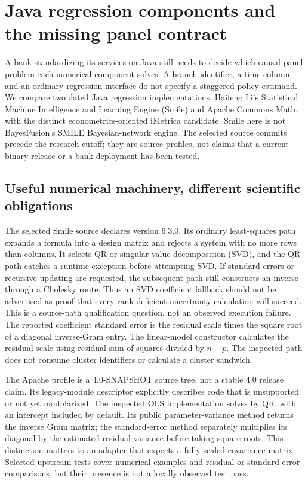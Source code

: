 
\section{Java regression components and the missing panel contract}
\label{sec:exec25-panels-java}
A bank standardizing its services on Java still needs to decide which causal
panel problem each numerical component solves. A branch identifier, a time
column and an ordinary regression interface do not specify a staggered-policy
estimand. We compare two dated Java regression implementations, Haifeng Li's
Statistical Machine Intelligence and Learning Engine (Smile) and Apache
Commons Math, with the distinct econometrics-oriented iMetrica candidate.
Smile here is not BayesFusion's SMILE Bayesian-network engine. The selected
source commits precede the research cutoff; they are source profiles, not
claims that a current binary release or a bank deployment has been tested.
\citep{exec25_paneljava_smile,exec25_paneljava_commons,exec25_paneljava_imetrica}

\subsection{Useful numerical machinery, different scientific obligations}
The selected Smile source declares version 6.3.0. Its ordinary least-squares
path expands a formula into a design matrix and rejects a system with no more
rows than columns. It selects QR or singular-value decomposition (SVD), and
the QR path catches a runtime exception before attempting SVD. If standard
errors or recursive updating are requested, the subsequent path still constructs
an inverse through a Cholesky route. Thus an SVD coefficient fallback should
not be advertised as proof that every rank-deficient uncertainty calculation
will succeed. This is a source-path qualification question, not an observed
execution failure. The reported coefficient standard error is the residual
scale times the square root of a diagonal inverse-Gram entry. The linear-model
constructor calculates the residual scale using residual sum of squares divided
by $n-p$. The inspected path does not consume cluster identifiers or calculate
a cluster sandwich.\citep{exec25_paneljava_smile}

The Apache profile is a 4.0-SNAPSHOT source tree, not a stable 4.0 release
claim. Its legacy-module descriptor explicitly describes code that is unsupported
or not yet modularized. The inspected OLS implementation solves by QR, with
an intercept included by default. Its public parameter-variance method returns
the inverse Gram matrix; the standard-error method separately multiplies its
diagonal by the estimated residual variance before taking square roots. This
distinction matters to an adapter that expects a fully scaled covariance matrix.
Selected upstream tests cover numerical examples and residual or standard-error
comparisons, but their presence is not a locally observed test pass.
\citep{exec25_paneljava_commons}

